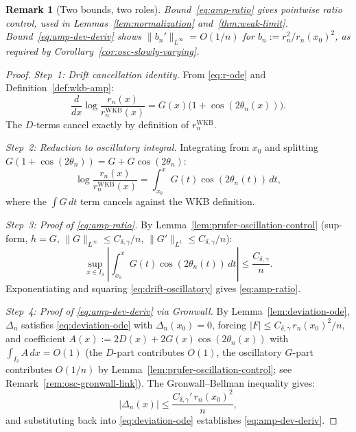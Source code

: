 \documentclass[12pt,a4paper]{amsart}
\newtheorem{remark}[theorem]{Remark}
\begin{document}
\begin{remark}[Two bounds, two roles]\label{rem:two-bounds}
Bound~\eqref{eq:amp-ratio} gives pointwise ratio control,
used in Lemmas~\ref{lem:normalization}
and~\ref{thm:weak-limit}.
Bound~\eqref{eq:amp-dev-deriv} shows
$\|b_n'\|_{L^\infty} = O(1/n)$
for $b_n := r_n^2/r_n(x_0)^2$,
as required by Corollary~\ref{cor:osc-slowly-varying}.
\end{remark}

\begin{proof}
\textit{Step~1: Drift cancellation identity.}
From \eqref{eq:r-ode} and Definition~\ref{def:wkb-amp}:
\[
  \frac{d}{dx}\log\frac{r_n(x)}{r_n^{\mathrm{WKB}}(x)}
  = G(x)\bigl(1 + \cos(2\theta_n(x))\bigr).
\]
The $D$-terms cancel exactly by definition of $r_n^{\mathrm{WKB}}$.

\textit{Step~2: Reduction to oscillatory integral.}
Integrating from $x_0$ and splitting
$G(1+\cos(2\theta_n)) = G + G\cos(2\theta_n)$:
\begin{equation}\label{eq:drift-oscillatory}
  \log\frac{r_n(x)}{r_n^{\mathrm{WKB}}(x)}
  = \int_{x_0}^x G(t)\cos(2\theta_n(t))\,dt,
\end{equation}
where the $\int G\,dt$ term cancels against the WKB definition.

\textit{Step~3: Proof of \eqref{eq:amp-ratio}.}
By Lemma~\ref{lem:prufer-oscillation-control}
(sup-form, $h = G$,
$\|G\|_{L^\infty} \le C_{\delta,\gamma}/n$,
$\|G'\|_{L^1} \le C_{\delta,\gamma}/n$):
\[
  \sup_{x \in I_\delta}
  \left|\int_{x_0}^x G(t)\cos(2\theta_n(t))\,dt\right|
  \le \frac{C_{\delta,\gamma}}{n}.
\]
Exponentiating and squaring \eqref{eq:drift-oscillatory}
gives \eqref{eq:amp-ratio}.

\textit{Step~4: Proof of \eqref{eq:amp-dev-deriv} via Gronwall.}
By Lemma~\ref{lem:deviation-ode}, $\Delta_n$ satisfies
\eqref{eq:deviation-ode} with $\Delta_n(x_0) = 0$,
forcing $|F| \le C_{\delta,\gamma}\,r_n(x_0)^2/n$,
and coefficient $A(x) := 2D(x) + 2G(x)\cos(2\theta_n(x))$
with $\int_{I_\delta} A\,dx = O(1)$ (the $D$-part contributes
$O(1)$, the oscillatory $G$-part contributes $O(1/n)$ by
Lemma~\ref{lem:prufer-oscillation-control};
see Remark~\ref{rem:osc-gronwall-link}).
The Gronwall--Bellman inequality \cite{Bellman1943} gives:
\[
  |\Delta_n(x)|
  \le \frac{C_{\delta,\gamma}'\,r_n(x_0)^2}{n},
\]
and substituting back into \eqref{eq:deviation-ode}
establishes \eqref{eq:amp-dev-deriv}.
\end{proof}

\end{document}
